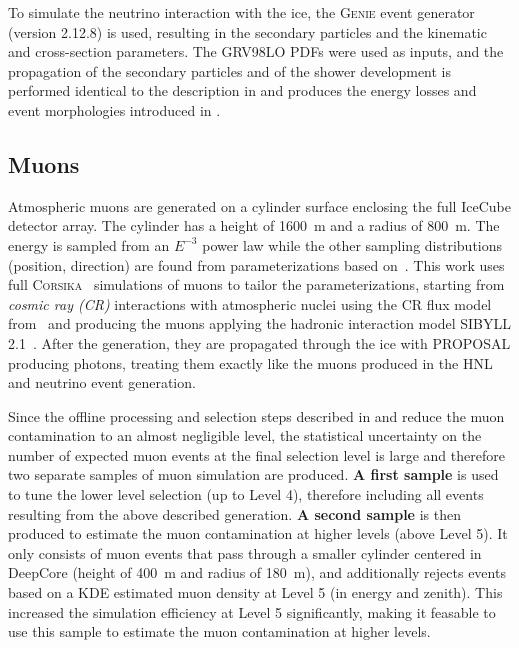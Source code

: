 To simulate the neutrino interaction with the ice, the \textsc{Genie} event generator~\cite{genie} (version 2.12.8) is used, resulting in the secondary particles and the kinematic and cross-section parameters. The GRV98LO PDFs were used as inputs, and the propagation of the secondary particles and of the shower development is performed identical to the description in  and produces the energy losses and event morphologies introduced in .


\subsection{Muons}

Atmospheric muons are generated on a cylinder surface enclosing the full IceCube detector array. The cylinder has a height of \SI{1600}{\meter} and a radius of \SI{800}{\meter}. The energy is sampled from an $E^{-3}$ power law while the other sampling distributions (position, direction) are found from parameterizations based on~. This work uses full \textsc{Corsika}~\cite{corsika} simulations of muons to tailor the parameterizations, starting from \textit{cosmic ray (CR)} interactions with atmospheric nuclei using the CR flux model from~ and producing the muons applying the hadronic interaction model SIBYLL 2.1~. After the generation, they are propagated through the ice with PROPOSAL producing photons, treating them exactly like the muons produced in the HNL and neutrino event generation.

Since the offline processing and selection steps described in  and  reduce the muon contamination to an almost negligible level, the statistical uncertainty on the number of expected muon events at the final selection level is large and therefore two separate samples of muon simulation are produced. \textbf{A first sample} is used to tune the lower level selection (up to Level 4), therefore including all events resulting from the above described generation. \textbf{A second sample} is then produced to estimate the muon contamination at higher levels (above Level 5). It only consists of muon events that pass through a smaller cylinder centered in DeepCore (height of \SI{400}{\meter} and radius of \SI{180}{\meter}), and additionally rejects events based on a KDE estimated muon density at Level 5 (in energy and zenith). This increased the simulation efficiency at Level 5 significantly, making it feasable to use this sample to estimate the muon contamination at higher levels.


